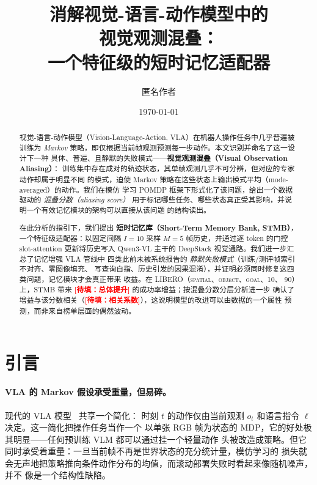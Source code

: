 \documentclass[11pt]{ctexart}
\title{消解视觉-语言-动作模型中的\\
视觉观测混叠：\\
一个特征级的短时记忆适配器}
\author{匿名作者}
\date{\today}
\newcommand{\todo}[1]{\textcolor{red}{\textbf{[待填：#1]}}}
\begin{document}
\maketitle

\begin{abstract}
视觉-语言-动作模型（Vision-Language-Action, VLA）在机器人操作任务中几乎普遍被训练为
\emph{Markov} 策略，即仅根据当前帧观测预测每一步动作。本文识别并命名了这一设计下一种
具体、普遍、且静默的失败模式——\textbf{视觉观测混叠（Visual Observation Aliasing）}：
训练集中存在成对的轨迹状态，其单帧观测几乎不可分辨，但对应的专家动作却属于明显不同
的模式，迫使 Markov 策略在这些状态上输出模式平均（mode-averaged）的动作。我们在模仿
学习 POMDP 框架下形式化了该问题，给出一个数据驱动的 \emph{混叠分数（aliasing score）}
用于标记哪些任务、哪些状态真正受其影响，并说明一个有效记忆模块的架构可以直接从该问题
的结构读出。

在此分析的指引下，我们提出 \textbf{短时记忆库（Short-Term Memory Bank, STMB）}，
一个特征级适配器：以固定间隔 $I{=}10$ 采样 $M{=}5$ 帧历史，并通过逐 token 的门控
slot-attention 更新将历史写入 Qwen3-VL 主干的 DeepStack 视觉通路。我们进一步汇总了记忆增强 VLA 管线中
四类此前未被系统报告的 \emph{静默失败模式}（训练/测评帧索引不对齐、零图像填充、
写查询自指、历史引发的因果混淆），并证明必须同时修复这四类问题，记忆模块才会真正带来
收益。在 LIBERO（\textsc{spatial}、\textsc{object}、\textsc{goal}、\textsc{10}、
\textsc{90}）上，STMB 带来 \todo{总体提升} 的成功率增益；按混叠分数分层分析进一步
确认了增益与该分数相关（\todo{相关系数}），这说明模型的改进可以由数据的一个属性
预测，而非来自榜单层面的偶然波动。
\end{abstract}

\section{引言}
\label{sec:intro}

\paragraph{VLA 的 Markov 假设承受重量，但易碎。}
现代的 VLA 模型~\cite{brohan2023rt2,kim2024openvla,black2024pi0} 共享一个简化：
时刻 $t$ 的动作仅由当前观测 $o_t$ 和语言指令 $\ell$ 决定。这一简化把操作任务当作一个
以单张 RGB 帧为状态的 MDP，它的好处极其明显——任何预训练 VLM 都可以通过挂一个轻量动作
头被改造成策略。但它同时承受着重量：一旦当前帧不再是世界状态的充分统计量，模仿学习的
损失就会无声地把策略推向条件动作分布的均值，而滚动部署失败时看起来像随机噪声，并不
像是一个结构性缺陷。
\end{document}
